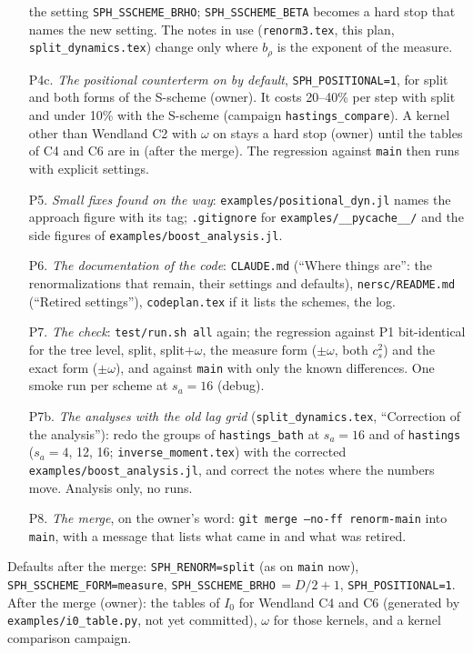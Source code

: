 \documentclass[11pt,aps,preprint,nofootinbib,superscriptaddress,tightenlines]{revtex4-2}
\begin{document}
\begin{enumerate}
  the setting \texttt{SPH\_SSCHEME\_BRHO}; \texttt{SPH\_SSCHEME\_BETA} becomes a hard stop that names the new setting.  The notes in use
  (\nolinkurl{renorm3.tex}, this plan, \nolinkurl{split_dynamics.tex}) change only where $b_\rho$ is the exponent of the measure.
\item[P4c.] \emph{The positional counterterm on by default}, \texttt{SPH\_POSITIONAL=1}, for split and both forms of the S-scheme (owner).  It
  costs 20--40\% per step with split and under 10\% with the S-scheme (campaign \texttt{hastings\_compare}).  A kernel other than Wendland C2 with
  $\omega$ on stays a hard stop (owner) until the tables of C4 and C6 are in (after the merge).  The regression against \texttt{main} then runs
  with explicit settings.
\item[P5.] \emph{Small fixes found on the way}: \nolinkurl{examples/positional_dyn.jl} names the approach figure with its tag; \texttt{.gitignore} for
  \nolinkurl{examples/__pycache__/} and the side figures of \nolinkurl{examples/boost_analysis.jl}.
\item[P6.] \emph{The documentation of the code}: \nolinkurl{CLAUDE.md} (``Where things are'': the renormalizations that remain, their settings and
  defaults), \nolinkurl{nersc/README.md} (``Retired settings''), \nolinkurl{codeplan.tex} if it lists the schemes, the log.
\item[P7.] \emph{The check}: \texttt{test/run.sh all} again; the regression against P1 bit-identical for the tree level, split, split$+\omega$, the
  measure form ($\pm\omega$, both $c_s^2$) and the exact form ($\pm\omega$), and against \texttt{main} with only the known differences.  One smoke run
  per scheme at $s_a=16$ (debug).
\item[P7b.] \emph{The analyses with the old lag grid} (\nolinkurl{split_dynamics.tex}, ``Correction of the analysis''): redo the groups of
  \texttt{hastings\_bath} at $s_a=16$ and of \texttt{hastings} ($s_a=4$, 12, 16; \nolinkurl{inverse_moment.tex}) with the corrected
  \nolinkurl{examples/boost_analysis.jl}, and correct the notes where the numbers move.  Analysis only, no runs.
\item[P8.] \emph{The merge}, on the owner's word: \texttt{git merge --no-ff renorm-main} into \texttt{main}, with a message that lists what came in and
  what was retired.
\end{enumerate}
Defaults after the merge: \texttt{SPH\_RENORM=split} (as on \texttt{main} now), \texttt{SPH\_SSCHEME\_FORM=measure},
\texttt{SPH\_SSCHEME\_BRHO}$\,=D/2+1$, \texttt{SPH\_POSITIONAL=1}.  After the merge (owner): the tables of $I_0$ for Wendland C4 and C6 (generated by
\nolinkurl{examples/i0_table.py}, not yet committed), $\omega$ for those kernels, and a kernel comparison campaign.
\end{document}
